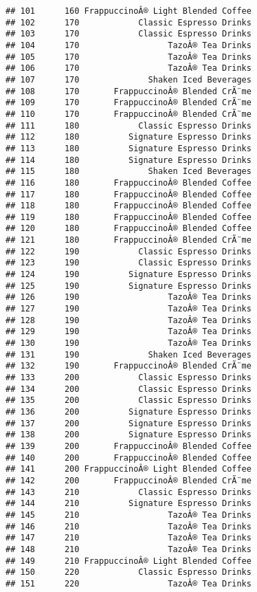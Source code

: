 \documentclass[
]{article}
\begin{document}
\begin{verbatim}
## 101      160 FrappuccinoÂ® Light Blended Coffee
## 102      170            Classic Espresso Drinks
## 103      170            Classic Espresso Drinks
## 104      170                  TazoÂ® Tea Drinks
## 105      170                  TazoÂ® Tea Drinks
## 106      170                  TazoÂ® Tea Drinks
## 107      170              Shaken Iced Beverages
## 108      170       FrappuccinoÂ® Blended CrÃ¨me
## 109      170       FrappuccinoÂ® Blended CrÃ¨me
## 110      170       FrappuccinoÂ® Blended CrÃ¨me
## 111      180            Classic Espresso Drinks
## 112      180          Signature Espresso Drinks
## 113      180          Signature Espresso Drinks
## 114      180          Signature Espresso Drinks
## 115      180              Shaken Iced Beverages
## 116      180       FrappuccinoÂ® Blended Coffee
## 117      180       FrappuccinoÂ® Blended Coffee
## 118      180       FrappuccinoÂ® Blended Coffee
## 119      180       FrappuccinoÂ® Blended Coffee
## 120      180       FrappuccinoÂ® Blended Coffee
## 121      180       FrappuccinoÂ® Blended CrÃ¨me
## 122      190            Classic Espresso Drinks
## 123      190            Classic Espresso Drinks
## 124      190          Signature Espresso Drinks
## 125      190          Signature Espresso Drinks
## 126      190                  TazoÂ® Tea Drinks
## 127      190                  TazoÂ® Tea Drinks
## 128      190                  TazoÂ® Tea Drinks
## 129      190                  TazoÂ® Tea Drinks
## 130      190                  TazoÂ® Tea Drinks
## 131      190              Shaken Iced Beverages
## 132      190       FrappuccinoÂ® Blended CrÃ¨me
## 133      200            Classic Espresso Drinks
## 134      200            Classic Espresso Drinks
## 135      200            Classic Espresso Drinks
## 136      200          Signature Espresso Drinks
## 137      200          Signature Espresso Drinks
## 138      200          Signature Espresso Drinks
## 139      200       FrappuccinoÂ® Blended Coffee
## 140      200       FrappuccinoÂ® Blended Coffee
## 141      200 FrappuccinoÂ® Light Blended Coffee
## 142      200       FrappuccinoÂ® Blended CrÃ¨me
## 143      210            Classic Espresso Drinks
## 144      210          Signature Espresso Drinks
## 145      210                  TazoÂ® Tea Drinks
## 146      210                  TazoÂ® Tea Drinks
## 147      210                  TazoÂ® Tea Drinks
## 148      210                  TazoÂ® Tea Drinks
## 149      210 FrappuccinoÂ® Light Blended Coffee
## 150      220            Classic Espresso Drinks
## 151      220                  TazoÂ® Tea Drinks

\end{verbatim}
\end{document}

